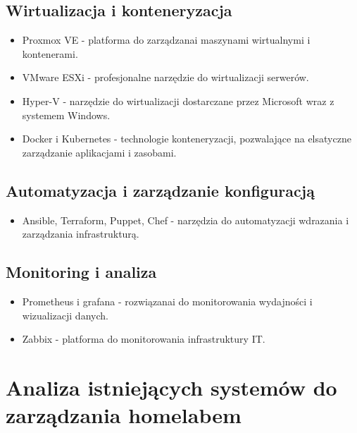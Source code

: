 \subsection{Wirtualizacja i konteneryzacja}
\begin{itemize}
    \item Proxmox VE - platforma do zarządzanai maszynami wirtualnymi i kontenerami.
    \item VMware ESXi - profesjonalne narzędzie do wirtualizacji serwerów.
    \item Hyper-V - narzędzie do wirtualizacji dostarczane przez Microsoft wraz z systemem Windows.
    \item Docker i Kubernetes - technologie konteneryzacji, pozwalające na elsatyczne zarządzanie aplikacjami i zasobami.
\end{itemize}

\subsection{Automatyzacja i zarządzanie konfiguracją}

\begin{itemize}
    \item Ansible, Terraform, Puppet, Chef - narzędzia do automatyzacji wdrazania i zarządzania infrastrukturą.
\end{itemize}

\subsection{Monitoring i analiza}
\begin{itemize}
    \item Prometheus i grafana - rozwiązanai do monitorowania wydajności i wizualizacji danych.
    \item Zabbix - platforma do monitorowania infrastruktury IT.
\end{itemize}

\section{Analiza istniejących systemów do zarządzania homelabem}
